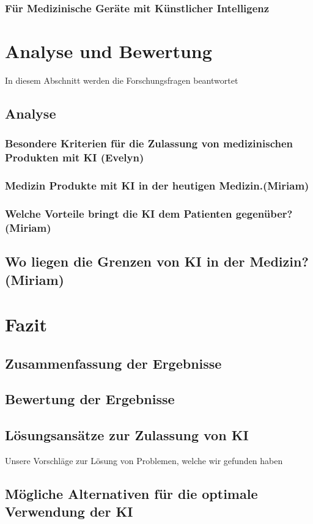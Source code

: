 \documentclass[a4paper, 12pt]{article}
\begin{document}
\subsubsection{Für Medizinische Geräte mit Künstlicher Intelligenz}


\section{Analyse und Bewertung}
In diesem Abschnitt werden die Forschungsfragen beantwortet
\subsection{Analyse}
\subsubsection{Besondere Kriterien für die Zulassung von medizinischen Produkten mit KI (Evelyn)}
\subsubsection{Medizin Produkte mit KI in der heutigen Medizin.(Miriam)}
\subsubsection{Welche Vorteile bringt die KI dem Patienten gegenüber? (Miriam)}
\subsection{Wo liegen die Grenzen von KI in der Medizin? (Miriam)}



\section{Fazit}
\subsection{Zusammenfassung der Ergebnisse}
\subsection{Bewertung der Ergebnisse}
\subsection{Lösungsansätze zur Zulassung von KI}
Unsere Vorschläge zur Lösung von Problemen, welche wir gefunden haben
\subsection{Mögliche Alternativen für die optimale Verwendung der KI}
\end{document}
